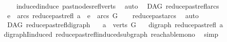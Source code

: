 \begin{isabellebody}
%
\isadelimproof
\ \ %
\endisadelimproof
%
\isatagproof
{}\isamarkupfalse%
\ \ induced{\isacharunderscore}{\kern0pt}induce\ past{\isacharunderscore}{\kern0pt}nodes{\isacharunderscore}{\kern0pt}refl{\isacharunderscore}{\kern0pt}verts\ \isamarkupfalse%
\ auto%
\endisatagproof
{\isafoldproof}%
%
\isadelimproof
\isanewline
%
\endisadelimproof
\isanewline
{}\isamarkupfalse%
\ {\isacharparenleft}{\kern0pt}\ DAG{\isacharparenright}{\kern0pt}\ reduce{\isacharunderscore}{\kern0pt}past{\isacharunderscore}{\kern0pt}refl{\isacharunderscore}{\kern0pt}arcs{}{\isacharcolon}{\kern0pt}\isanewline
\ \ {\isachardoublequoteopen}e\ {\isasymin}\ arcs\ {\isacharparenleft}{\kern0pt}reduce{\isacharunderscore}{\kern0pt}past{\isacharunderscore}{\kern0pt}refl\ a{\isacharparenright}{\kern0pt}\ {\isasymLongrightarrow}\ e\ {\isasymin}\ arcs\ G{\isachardoublequoteclose}\isanewline
%
\isadelimproof
\ \ %
\endisadelimproof
%
\isatagproof
{}\isamarkupfalse%
\ reduce{\isacharunderscore}{\kern0pt}past{\isacharunderscore}{\kern0pt}arcs\ \isamarkupfalse%
\ auto%
\endisatagproof
{\isafoldproof}%
%
\isadelimproof
\isanewline
%
\endisadelimproof
\isanewline
{}\isamarkupfalse%
\ {\isacharparenleft}{\kern0pt}\ DAG{\isacharparenright}{\kern0pt}\ reduce{\isacharunderscore}{\kern0pt}past{\isacharunderscore}{\kern0pt}refl{\isacharunderscore}{\kern0pt}digraph{\isacharcolon}{\kern0pt}\isanewline
\ \ \ {\isachardoublequoteopen}a\ {\isasymin}\ verts\ G{\isachardoublequoteclose}\isanewline
\ \ \ {\isachardoublequoteopen}digraph\ {\isacharparenleft}{\kern0pt}reduce{\isacharunderscore}{\kern0pt}past{\isacharunderscore}{\kern0pt}refl\ a{\isacharparenright}{\kern0pt}{\isachardoublequoteclose}\isanewline
%
\isadelimproof
\ \ %
\endisadelimproof
%
\isatagproof
{}\isamarkupfalse%
\ digraphI{\isacharunderscore}{\kern0pt}induced\ reduce{\isacharunderscore}{\kern0pt}past{\isacharunderscore}{\kern0pt}refl{\isacharunderscore}{\kern0pt}induced{\isacharunderscore}{\kern0pt}subgraph\ reachable{\isacharunderscore}{\kern0pt}mono\ \isamarkupfalse%
\ simp%
\endisatagproof
{\isafoldproof}%
%
\isadelimproof
\isanewline
%
\endisadelimproof
%
\isadelimtheory
\isanewline
%
\endisadelimtheory
%
\isatagtheory
{}\isamarkupfalse%
%
\endisatagtheory
{\isafoldtheory}%
%
\isadelimtheory
%
\endisadelimtheory
%
\end{isabellebody}%
\endinput
